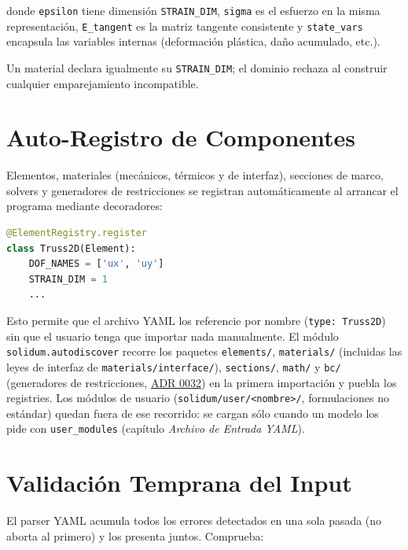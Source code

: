 \documentclass[11pt,oneside]{report}
\begin{document}
donde \texttt{epsilon} tiene dimensión \texttt{STRAIN\_DIM}, \texttt{sigma} es el esfuerzo en la misma representación, \texttt{E\_tangent} es la matriz tangente consistente y \texttt{state\_vars} encapsula las variables internas (deformación plástica, daño acumulado, etc.).

Un material declara igualmente su \texttt{STRAIN\_DIM}; el dominio rechaza al construir cualquier emparejamiento incompatible.

\section{Auto-Registro de Componentes}

Elementos, materiales (mecánicos, térmicos y de interfaz), secciones de marco, solvers y generadores de restricciones se registran automáticamente al arrancar el programa mediante decoradores:

\begin{lstlisting}[language=Python]
@ElementRegistry.register
class Truss2D(Element):
    DOF_NAMES = ['ux', 'uy']
    STRAIN_DIM = 1
    ...

\end{lstlisting}

Esto permite que el archivo YAML los referencie por nombre (\texttt{type: Truss2D}) sin que el usuario tenga que importar nada manualmente. El módulo \texttt{solidum.\allowbreak{}autodiscover} recorre los paquetes \texttt{elements/}, \texttt{materials/} (incluidas las leyes de interfaz de \texttt{materials/\allowbreak{}interface/\allowbreak{}}), \texttt{sections/}, \texttt{math/} y \texttt{bc/} (generadores de restricciones, \href{https://github.com/jretamav/solidum-fem/blob/main/docs/adr/0032-restricciones-generadas-y-refuerzo-embebido.md}{ADR 0032}) en la primera importación y puebla los registries. Los módulos de usuario (\texttt{solidum/\allowbreak{}user/\allowbreak{}\textless{}nombre\textgreater{}/\allowbreak{}}, formulaciones no estándar) quedan fuera de ese recorrido: se cargan sólo cuando un modelo los pide con \texttt{user\_modules} (capítulo \textit{Archivo de Entrada YAML}).

\section{Validación Temprana del Input}

El parser YAML acumula todos los errores detectados en una sola pasada (no aborta al primero) y los presenta juntos. Comprueba:
\end{document}
